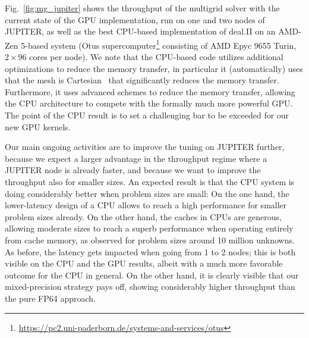 \documentclass[a4paper,12pt]{article}
\begin{document}
Fig.~\ref{fig:mg_jupiter} shows the throughput of the multigrid solver with
the current state of the GPU implementation, run on one and two nodes of
JUPITER, as well as the best CPU-based implementation of deal.II on an AMD-Zen
5-based system (Otus
supercomputer\footnote{\url{https://pc2.uni-paderborn.de/systems-and-services/otus}}
consisting of AMD Epyc 9655 Turin, $2\times 96$ cores per node). We note that the CPU-based
code utilizes additional optimizations to reduce the memory transfer, in
particular it (automatically) uses that the mesh is
Cartesian~\citep{KronbichlerKormann2012} that significantly reduces the memory
transfer. Furthermore, it uses advanced schemes to reduce the memory transfer,
allowing the CPU architecture to compete with the formally much more powerful
GPU. The point of the CPU result is to set a challenging bar to be exceeded
for our new GPU kernels.

Our main ongoing activities are to improve the tuning on
JUPITER further, because we expect a larger advantage in the throughput regime
where a JUPITER node is already faster, and because we want to improve the
throughput also for smaller sizes. An expected result is that the CPU system
is doing considerably better when problem sizes are small: On the one hand,
the lower-latency design of a CPU allows to reach a high performance for
smaller problem sizes already. On the other hand, the caches in CPUs are
generous, allowing moderate sizes to reach a superb performance when operating
entirely from cache memory, as observed for problem sizes around 10 million
unknowns.  As before, the latency gets impacted when going from 1 to 2 nodes;
this is both visible on the CPU and the GPU results, albeit with a much more
favorable outcome for the CPU in general. On the other hand, it is clearly
visible that our mixed-precision strategy pays off, showing considerably
higher throughput than the pure FP64 approach.
\end{document}
